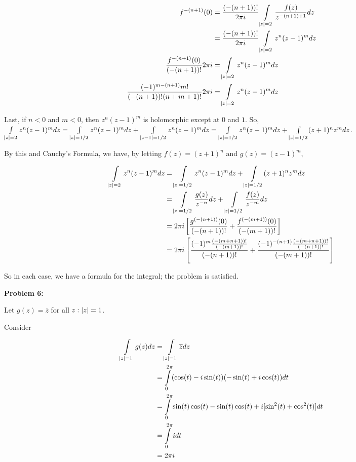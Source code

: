 \documentclass[a4paper,12pt]{article}
\begin{document}
\begin{align*}
f^{-(n+1)}(0) &= \frac{(-(n+1))!}{2\pi i} \int\limits_{\left\lvert z \right\rvert=2} \frac{f(z)}{z^{-(n+1)+1}} dz\\
&= \frac{(-(n+1))!}{2\pi i} \int\limits_{\left\lvert z \right\rvert=2} z^n(z-1)^m dz\\
\frac{f^{-(n+1)}(0)}{(-(n+1))!} 2\pi i &= \int\limits_{\left\lvert z \right\rvert=2} z^n(z-1)^m dz\\
\frac{(-1)^{m-(n+1)}m!}{(-(n+1))!(n+m+1)!} 2\pi i &= \int\limits_{\left\lvert z \right\rvert=2} z^n(z-1)^m dz\\
\end{align*}
\vspace{5mm}

Last, if $n < 0$ and $m < 0$, then $z^n(z-1)^m$ is holomorphic except at $0$ and $1$. So, $\int\limits_{\left\lvert z \right\rvert=2} z^n(z-1)^m dz = \int\limits_{\left\lvert z \right\rvert=1/2} z^n(z-1)^m dz + \int\limits_{\left\lvert z-1 \right\rvert=1/2} z^n(z-1)^m dz = \int\limits_{\left\lvert z \right\rvert=1/2} z^n(z-1)^m dz + \int\limits_{\left\lvert z \right\rvert=1/2} (z+1)^nz^m dz$.

By this and Cauchy's Formula, we have, by letting $f(z)=(z+1)^n$ and $g(z) = (z-1)^m$, %

\begin{align*}
\int\limits_{\left\lvert z \right\rvert=2} z^n(z-1)^m dz  &= \int\limits_{\left\lvert z \right\rvert=1/2} z^n(z-1)^m dz + \int\limits_{\left\lvert z \right\rvert=1/2} (z+1)^nz^m dz \\
&= \int\limits_{\left\lvert z \right\rvert=1/2} \frac{g(z)}{z^{-n}} dz + \int\limits_{\left\lvert z \right\rvert=1/2} \frac{f(z)}{z^{-m}} dz \\
&= 2 \pi i \left[\frac{g^{(-(n+1))}(0)}{(-(n+1))!} + \frac{f^{(-(m+1))}(0)}{(-(m+1))!}\right]\\
&= 2 \pi i \left[\frac{(-1)^m \frac{(-(m+n+1))!}{(-(m+1))!}}{(-(n+1))!} + \frac{(-1)^{-(n+1)} \frac{(-(m+n+1))!}{(-(n+1))!}}{(-(m+1))!}\right]
\end{align*}

So in each case, we have a formula for the integral; the problem is satisfied.

\shunt

{\bf Problem 6:}

Let $g(z) = \overline{z}$ for all $z: \left\lvert z \right\rvert = 1$.

Consider 

\begin{align*}
\int\limits_{\left\lvert z \right\rvert=1} g(z)dz &= \int\limits_{\left\lvert z \right\rvert=1} \overline{z}dz\\
&= \int\limits_0^{2\pi} (\cos(t)-i\sin(t))(-\sin(t)+i\cos(t))dt\\
&= \int\limits_0^{2\pi} \sin(t)\cos(t)-\sin(t)\cos(t) + i[\sin^2(t)+\cos^2(t)]dt\\
&= \int\limits_0^{2\pi} idt\\
&=2\pi i
\end{align*}
\end{document}
